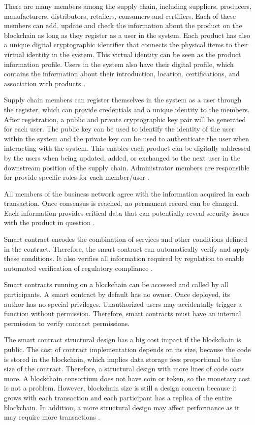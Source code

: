 There are many members among the supply chain, including suppliers, producers, manufacturers, distributors, retailers, consumers and certifiers. Each of these members can add, update and check the information about the product on the blockchain as long as they register as a user in the system. Each product has also a unique digital cryptographic identifier that connects the physical items to their virtual identity in the system. This virtual identity can be seen as the product information profile. Users in the system also have their digital profile, which contains the information about their introduction, location, certifications, and association with products \cite{tian2017supply}.

Supply chain members can register themselves in the system as a user through the register, which can provide credentials and a unique identity to the members. After registration, a public and private cryptographic key pair will be generated for each user. The public key can be used to identify the identity of the user within the system and the private key can be used to authenticate the user when interacting with the system. This enables each product can be digitally addressed by the users when being updated, added, or exchanged to the next user in the downstream position of the supply chain. Administrator members are responsible for provide specific roles for each member/user \cite{caro2018blockchain}.

All members of the business network agree with the information acquired in each transaction. Once consensus is reached, no permanent record can be changed. Each information provides critical data that can potentially reveal security issues with the product in question \cite{galvez2018future}.

Smart contract encodes the combination of services and other conditions defined in the contract. Therefore, the smart contract can automatically verify and apply these conditions. It also verifies all information required by regulation to enable automated verification of regulatory compliance \cite{lu2017adaptable}. 

Smart contracts running on a blockchain can be accessed and called by all participants. A smart contract by default has no owner. Once deployed, its author has no special privileges. Unauthorized users may accidentally trigger a function without permission. Therefore, smart contracts must have an internal permission to verify contract permissions.

The smart contract structural design has a big cost impact if the blockchain is public. The cost of contract implementation depends on its size, because the code is stored in the blockchain, which implies data storage fees proportional to the size of the contract. Therefore, a structural design with more lines of code costs more. A blockchain consortium does not have coin or token, so the monetary cost is not a problem. However, blockchain size is still a design concern because it grows with each transaction and each participant has a replica of the entire blockchain. In addition, a more structural design may affect performance as it may require more transactions \cite{lu2017adaptable}.

